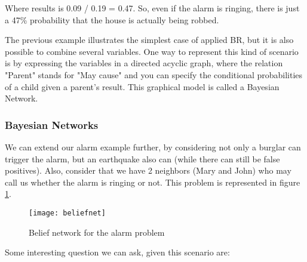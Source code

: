 Where results is 0.09 / 0.19 = 0.47. So, even if the alarm is ringing, there is
just a 47\% probability that the house is actually being robbed.

The previous example illustrates the simplest case of applied BR, but it is
also possible to combine several variables.
One way to represent this kind of scenario is by expressing the variables in a directed acyclic
graph, where the relation "Parent" stands for "May cause" and you can specify
the conditional probabilities of a child given a parent's result. This graphical
model is called a Bayesian Network.

\subsubsection{Bayesian Networks}

We can extend our alarm example further, by considering not only a burglar
can trigger the alarm, but an earthquake also can (while there can still be
false positives). Also, consider that we have 2 neighbors (Mary and John) who
may call us whether the alarm is ringing or not. This problem is represented in
figure \ref{fig:beliefnet}.

\begin{figure}[t]
  \begin{center}
    \leavevmode
    \texttt{[image: beliefnet]}
    \caption{Belief network for the alarm problem \cite{belfn}}
    \label{fig:beliefnet}
  \end{center}
\end{figure}

Some interesting question we can ask, given this scenario are:

